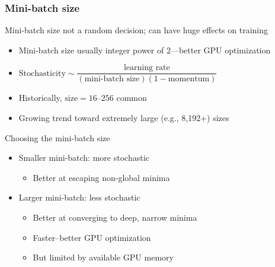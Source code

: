 \begin{frame}
    \frametitle{Mini-batch size}

    Mini-batch size not a random decision; can have huge effects on training
    \begin{itemize}
        \item Mini-batch size usually integer power of 2---better GPU optimization
        \item $\text{Stochasticity} \sim \dfrac{\text{learning rate}}{(\text{mini-batch size}) (1 - \text{momentum})}$ \citep{SmithNIPS17}
        \item Historically, $\text{size} = 16 \text{--} 256$ common
        \item Growing trend toward extremely large (e.g., 8,192+) sizes
    \end{itemize}
    \pause

    Choosing the mini-batch size
    \begin{itemize}
        \item Smaller mini-batch: more stochastic
        \begin{itemize}
            \item Better at escaping non-global minima
        \end{itemize}
        \item Larger mini-batch: less stochastic
        \begin{itemize}
            \item Better at converging to deep, narrow minima
            \item Faster--better GPU optimization
            \item But limited by available GPU memory
        \end{itemize}
    \end{itemize}
\end{frame}


